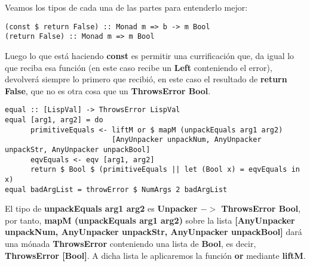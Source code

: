 Veamos los tipos de cada una de las partes para entenderlo mejor:\\

\begin{minipage}{\linewidth}
\begin{footnotesize}
\begin{lstlisting}[frame=single]
(const $ return False) :: Monad m => b -> m Bool
(return False) :: Monad m => m Bool
\end{lstlisting}
\end{footnotesize}
\end{minipage}

Luego lo que est\'a haciendo \textbf{const} es permitir una currificaci\'on que, da igual lo que reciba esa funci\'on (en este caso recibe un \textbf{Left} conteniendo el error), devolver\'a siempre lo primero que recibi\'o, en este caso el resultado de \textbf{return False}, que no es otra cosa que un \textbf{ThrowsError Bool}.

\begin{minipage}{\linewidth}
\begin{tiny}
\begin{lstlisting}[frame=single]
equal :: [LispVal] -> ThrowsError LispVal
equal [arg1, arg2] = do
      primitiveEquals <- liftM or $ mapM (unpackEquals arg1 arg2) 
                         [AnyUnpacker unpackNum, AnyUnpacker unpackStr, AnyUnpacker unpackBool]
      eqvEquals <- eqv [arg1, arg2]
      return $ Bool $ (primitiveEquals || let (Bool x) = eqvEquals in x)
equal badArgList = throwError $ NumArgs 2 badArgList
\end{lstlisting}
\end{tiny}
\end{minipage}

El tipo de \textbf{unpackEquals arg1 arg2} es \textbf{Unpacker $-\!>$ ThrowsError Bool}, por tanto, \textbf{mapM (unpackEquals arg1 arg2)} sobre la lista \textbf{[AnyUnpacker unpackNum, AnyUnpacker unpackStr, AnyUnpacker unpackBool]} dar\'a una m\'onada \textbf{ThrowsError} conteniendo una lista de \textbf{Bool}, es decir, \textbf{ThrowsError [Bool]}. A dicha lista le aplicaremos la funci\'on \textbf{or} mediante \textbf{liftM}.\\